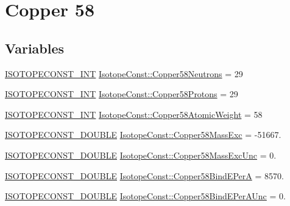 \hypertarget{group___isotope_const-_copper-_cu58}{}\section{Copper 58}
\label{group___isotope_const-_copper-_cu58}
\subsection*{Variables}
\begin{DoxyCompactItemize}
\item 
\mbox{\hyperlink{group___isotope_const-_macros_ga5f18360b3e99483a35c32d789e62621c}{I\+S\+O\+T\+O\+P\+E\+C\+O\+N\+S\+T\+\_\+\+I\+NT}} \mbox{\hyperlink{group___isotope_const-_copper-_cu58_ga0bb9ef464064f0443f2b0a7e47900eda}{Isotope\+Const\+::\+Copper58\+Neutrons}} = 29
\item 
\mbox{\hyperlink{group___isotope_const-_macros_ga5f18360b3e99483a35c32d789e62621c}{I\+S\+O\+T\+O\+P\+E\+C\+O\+N\+S\+T\+\_\+\+I\+NT}} \mbox{\hyperlink{group___isotope_const-_copper-_cu58_ga8323439619fb3ceef4b541c5bac2ddf9}{Isotope\+Const\+::\+Copper58\+Protons}} = 29
\item 
\mbox{\hyperlink{group___isotope_const-_macros_ga5f18360b3e99483a35c32d789e62621c}{I\+S\+O\+T\+O\+P\+E\+C\+O\+N\+S\+T\+\_\+\+I\+NT}} \mbox{\hyperlink{group___isotope_const-_copper-_cu58_gaa9ccdae97afc2a4463fcc1b8072fdfa3}{Isotope\+Const\+::\+Copper58\+Atomic\+Weight}} = 58
\item 
\mbox{\hyperlink{group___isotope_const-_macros_ga8f45a7272ce02c0b4c65c44636ed719a}{I\+S\+O\+T\+O\+P\+E\+C\+O\+N\+S\+T\+\_\+\+D\+O\+U\+B\+LE}} \mbox{\hyperlink{group___isotope_const-_copper-_cu58_gaf9f9082962fee76e262edac355e27ec8}{Isotope\+Const\+::\+Copper58\+Mass\+Exc}} = -\/51667.
\item 
\mbox{\hyperlink{group___isotope_const-_macros_ga8f45a7272ce02c0b4c65c44636ed719a}{I\+S\+O\+T\+O\+P\+E\+C\+O\+N\+S\+T\+\_\+\+D\+O\+U\+B\+LE}} \mbox{\hyperlink{group___isotope_const-_copper-_cu58_ga135e0f9b0f3855d0e0e2c473308fc28a}{Isotope\+Const\+::\+Copper58\+Mass\+Exc\+Unc}} = 0.
\item 
\mbox{\hyperlink{group___isotope_const-_macros_ga8f45a7272ce02c0b4c65c44636ed719a}{I\+S\+O\+T\+O\+P\+E\+C\+O\+N\+S\+T\+\_\+\+D\+O\+U\+B\+LE}} \mbox{\hyperlink{group___isotope_const-_copper-_cu58_gabf8c61877902e7cec4a45c3e12042e3e}{Isotope\+Const\+::\+Copper58\+Bind\+E\+PerA}} = 8570.
\item 
\mbox{\hyperlink{group___isotope_const-_macros_ga8f45a7272ce02c0b4c65c44636ed719a}{I\+S\+O\+T\+O\+P\+E\+C\+O\+N\+S\+T\+\_\+\+D\+O\+U\+B\+LE}} \mbox{\hyperlink{group___isotope_const-_copper-_cu58_gaf9132c56b5182e106a0c087ee0184928}{Isotope\+Const\+::\+Copper58\+Bind\+E\+Per\+A\+Unc}} = 0.

\end{DoxyCompactItemize}
